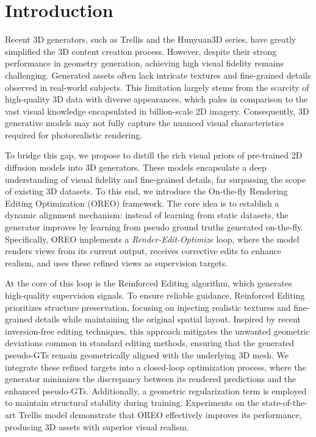 \documentclass[runningheads]{llncs}
\begin{document}

\section{Introduction}
\label{sec:intro}

Recent 3D generators, such as Trellis and the Hunyuan3D series, have greatly simplified the 3D content creation process.
However, despite their strong performance in geometry generation, achieving high visual fidelity remains challenging.
Generated assets often lack intricate textures and fine-grained details observed in real-world subjects.
This limitation largely stems from the scarcity of high-quality 3D data with diverse appearances, which pales in comparison to the vast visual knowledge encapsulated in billion-scale 2D imagery.
Consequently, 3D generative models may not fully capture the nuanced visual characteristics required for photorealistic rendering.

To bridge this gap, we propose to distill the rich visual priors of pre-trained 2D diffusion models into 3D generators.
These models encapsulate a deep understanding of visual fidelity and fine-grained details, far surpassing the scope of existing 3D datasets.
To this end, we introduce the On-the-fly Rendering Editing Optimization (OREO) framework.
The core idea is to establish a dynamic alignment mechanism: instead of learning from static datasets, the generator improves by learning from pseudo ground truths generated on-the-fly.
Specifically, OREO implements a \textit{Render-Edit-Optimize} loop, where the model renders views from its current output, receives corrective edits to enhance realism, and uses these refined views as supervision targets.

At the core of this loop is the Reinforced Editing algorithm, which generates high-quality supervision signals.
To ensure reliable guidance, Reinforced Editing prioritizes structure preservation, focusing on injecting realistic textures and fine-grained details while maintaining the original spatial layout.
Inspired by recent inversion-free editing techniques, this approach mitigates the unwanted geometric deviations common in standard editing methods, ensuring that the generated pseudo-GTs remain geometrically aligned with the underlying 3D mesh.
We integrate these refined targets into a closed-loop optimization process, where the generator minimizes the discrepancy between its rendered predictions and the enhanced pseudo-GTs.
Additionally, a geometric regularization term is employed to maintain structural stability during training.
Experiments on the state-of-the-art Trellis model demonstrate that OREO effectively improves its performance, producing 3D assets with superior visual realism.
\end{document}
